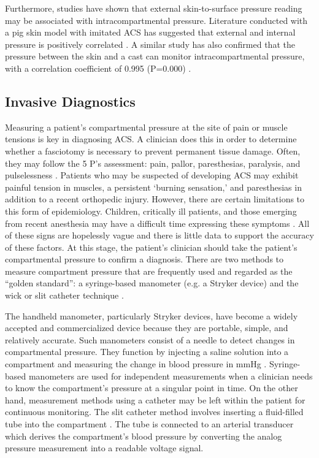\documentclass[times, twoside]{zHenriquesLab-StyleBioRxiv}
\begin{document}
Furthermore, studies have shown that external skin-to-surface pressure reading may be associated with intracompartmental pressure. Literature conducted with a pig skin model with imitated ACS has suggested that external and internal pressure is positively correlated \cite{gu2021new}. A similar study has also confirmed that the pressure between the skin and a cast can monitor intracompartmental pressure, with a correlation coefficient of 0.995 (P=0.000) \cite{uslu2000can}.

\subsection*{Invasive Diagnostics}
Measuring a patient’s compartmental pressure at the site of pain or muscle tensions is key in diagnosing ACS. A clinician does this in order to determine whether a fasciotomy is necessary to prevent permanent tissue damage. Often, they may follow the 5 P's assessment:  pain, pallor, paresthesias, paralysis, and pulselessness \cite{andrews1990neurovascular}. Patients who may be suspected of developing ACS may exhibit painful tension in muscles, a persistent ‘burning sensation,’ and paresthesias in addition to a recent orthopedic injury. However, there are certain limitations to this form of epidemiology. Children, critically ill patients, and those emerging from recent anesthesia may have a difficult time expressing these symptoms \cite{hammerberg2023}. All of these signs are hopelessly vague and there is little data to support the accuracy of these factors. At this stage, the patient’s clinician should take the patient’s compartmental pressure to confirm a diagnosis. There are two methods to measure compartment pressure that are frequently used and regarded as the “golden standard”: a syringe-based manometer (e.g. a Stryker device) and the wick or slit catheter technique \cite{allen2020classification}. 

The handheld manometer, particularly Stryker devices, have become a widely accepted and commercialized device because they are portable, simple, and relatively accurate. Such manometers consist of a needle to detect changes in compartmental pressure. They function by injecting a saline solution into a compartment and measuring the change in blood pressure in mmHg \cite{ULIASZ2003143}. Syringe-based manometers are used for independent measurements when a clinician needs to know the compartment’s pressure at a singular point in time. On the other hand, measurement methods using a catheter may be left within the patient for continuous monitoring. The slit catheter method involves inserting a fluid-filled tube into the compartment \cite{ULIASZ2003143}. The tube is connected to an arterial transducer which derives the compartment’s blood pressure by converting the analog pressure measurement into a readable voltage signal. 
\end{document}
